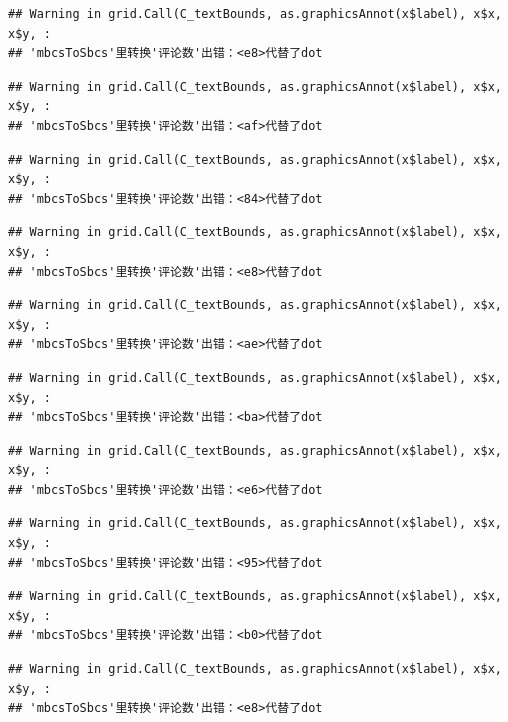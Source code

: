 \documentclass[
]{article}
\begin{document}
\begin{verbatim}
## Warning in grid.Call(C_textBounds, as.graphicsAnnot(x$label), x$x, x$y, :
## 'mbcsToSbcs'里转换'评论数'出错：<e8>代替了dot
\end{verbatim}

\begin{verbatim}
## Warning in grid.Call(C_textBounds, as.graphicsAnnot(x$label), x$x, x$y, :
## 'mbcsToSbcs'里转换'评论数'出错：<af>代替了dot
\end{verbatim}

\begin{verbatim}
## Warning in grid.Call(C_textBounds, as.graphicsAnnot(x$label), x$x, x$y, :
## 'mbcsToSbcs'里转换'评论数'出错：<84>代替了dot
\end{verbatim}

\begin{verbatim}
## Warning in grid.Call(C_textBounds, as.graphicsAnnot(x$label), x$x, x$y, :
## 'mbcsToSbcs'里转换'评论数'出错：<e8>代替了dot
\end{verbatim}

\begin{verbatim}
## Warning in grid.Call(C_textBounds, as.graphicsAnnot(x$label), x$x, x$y, :
## 'mbcsToSbcs'里转换'评论数'出错：<ae>代替了dot
\end{verbatim}

\begin{verbatim}
## Warning in grid.Call(C_textBounds, as.graphicsAnnot(x$label), x$x, x$y, :
## 'mbcsToSbcs'里转换'评论数'出错：<ba>代替了dot
\end{verbatim}

\begin{verbatim}
## Warning in grid.Call(C_textBounds, as.graphicsAnnot(x$label), x$x, x$y, :
## 'mbcsToSbcs'里转换'评论数'出错：<e6>代替了dot
\end{verbatim}

\begin{verbatim}
## Warning in grid.Call(C_textBounds, as.graphicsAnnot(x$label), x$x, x$y, :
## 'mbcsToSbcs'里转换'评论数'出错：<95>代替了dot
\end{verbatim}

\begin{verbatim}
## Warning in grid.Call(C_textBounds, as.graphicsAnnot(x$label), x$x, x$y, :
## 'mbcsToSbcs'里转换'评论数'出错：<b0>代替了dot
\end{verbatim}

\begin{verbatim}
## Warning in grid.Call(C_textBounds, as.graphicsAnnot(x$label), x$x, x$y, :
## 'mbcsToSbcs'里转换'评论数'出错：<e8>代替了dot
\end{verbatim}
\end{document}
